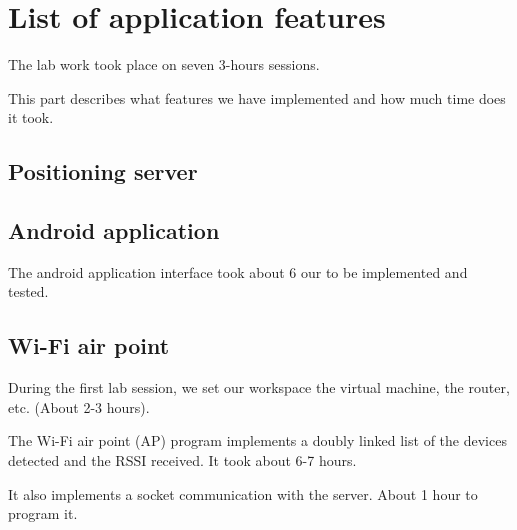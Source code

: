 \section{List of application features}

The lab work took place on seven 3-hours sessions.

This part describes what features we have implemented and how much time does it
took.

\subsection{Positioning server}

\subsection{Android application}

The android application interface took about 6 our to be implemented and tested.

\subsection{Wi-Fi air point}

During the first lab session, we set our workspace the virtual machine, 
the router, etc. (About 2-3 hours).

The Wi-Fi air point (AP) program implements a doubly linked list of the devices
detected and the RSSI received. It took about 6-7 hours.

It also implements a socket communication with the server. About 1 hour to
program it.





